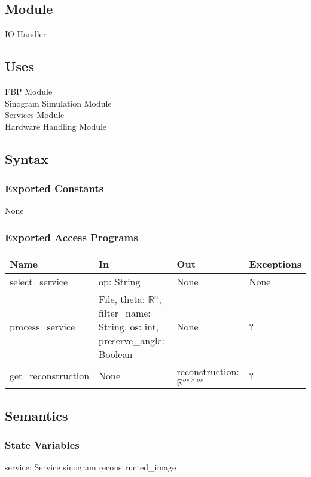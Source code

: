 \documentclass[12pt, titlepage]{article}
\begin{document}
\subsection{Module}
IO Handler

\subsection{Uses}
FBP Module\\
Sinogram Simulation Module\\
Services Module\\
Hardware Handling Module\\

\subsection{Syntax}

\subsubsection{Exported Constants}
None

\subsubsection{Exported Access Programs}

\begin{center}
\begin{tabular}{|l|m{18em}|l|l|}
  \hline
  \textbf{Name} & \textbf{In} & \textbf{Out} & \textbf{Exceptions} \\
  \hline
  select\_service & op: String & None & None \\
  process\_service & File, theta: \(\mathbb{R}^{n}\), filter\_name: String, os: int, preserve\_angle: Boolean & None & ? \\
  get\_reconstruction & None & reconstruction: \(\mathbb{R}^{os \times os}\) & ? \\
  \hline
\end{tabular}
\end{center}

\subsection{Semantics}

\subsubsection{State Variables}
service: Service
sinogram
reconstructed\_image
\end{document}
